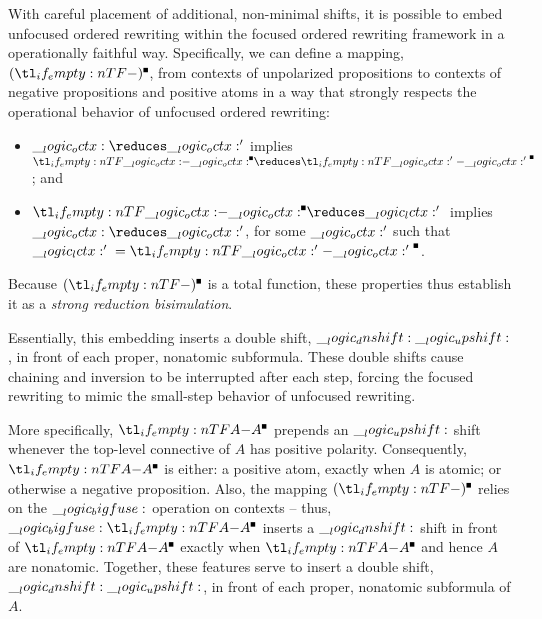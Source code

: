 With careful placement of additional, non-minimal shifts, it is possible to embed unfocused ordered rewriting within the focused ordered rewriting framework in a operationally faithful way.
Specifically, we can define a mapping, $\embedb*{}$, from contexts of unpolarized propositions to contexts of negative propositions and positive atoms in a way that strongly respects the operational behavior of unfocused ordered rewriting:
\begin{itemize}[noitemsep]
\item $\octx \reduces \octx'$ implies $\embedb{\octx} \reduces \embedb{\octx'{}}$; and
\item $\embedb{\octx} \reduces \np{\lctx'{}}$ implies $\octx \reduces \octx'$, for some $\__logic_octx:'$ such that $\np{\lctx'{}} = \embedb{\octx'{}}$.
\end{itemize}
Because $\embedb*{}$ is a total function, these properties thus establish it as a \emph{strong reduction bisimulation}\autocite{Sangiorgi+Walker:CUP03}.

Essentially, this embedding inserts a double shift, $\__logic_dnshift: \__logic_upshift:$, in front of each proper, nonatomic subformula.
These double shifts cause chaining and inversion to be interrupted after each step, forcing the focused rewriting to mimic the small-step behavior of unfocused rewriting.

More specifically, $\embedb{A}$ prepends an $\__logic_upshift:$ shift whenever the top-level connective of $A$ has positive polarity.
Consequently, $\embedb{A}$ is either: a positive atom, exactly when $A$ is atomic; or otherwise a negative proposition.
Also, the mapping $\embedb*{}$ relies on the $\__logic_bigfuse:$ operation on contexts -- thus, $\bigfuse \embedb{A}$ inserts a $\__logic_dnshift:$ shift in front of $\embedb{A}$ exactly when $\embedb{A}$ and hence $A$ are nonatomic.
Together, these features serve to insert a double shift, $\__logic_dnshift: \__logic_upshift:$, in front of each proper, nonatomic subformula of $A$.

